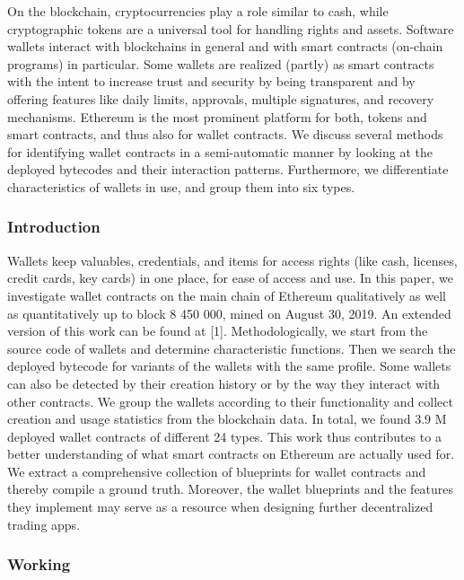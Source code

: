 \documentclass[12pt]{article}
\begin{document}
   On the blockchain, cryptocurrencies play a role
similar to cash, while cryptographic tokens are a universal
tool for handling rights and assets. Software wallets interact
with blockchains in general and with smart contracts (on-chain
programs) in particular. Some wallets are realized (partly) as
smart contracts with the intent to increase trust and security
by being transparent and by offering features like daily limits,
approvals, multiple signatures, and recovery mechanisms.
Ethereum is the most prominent platform for both, tokens
and smart contracts, and thus also for wallet contracts. We
discuss several methods for identifying wallet contracts in a
semi-automatic manner by looking at the deployed bytecodes
and their interaction patterns. Furthermore, we differentiate
characteristics of wallets in use, and group them into six types.

\subsubsection{Introduction}

\par 
Wallets keep valuables, credentials, and items for access
rights (like cash, licenses, credit cards, key cards) in one place,
for ease of access and use. In this paper, we investigate wallet
contracts on the main chain of Ethereum qualitatively as well
as quantitatively up to block 8 450 000, mined on August 30,
2019. An extended version of this work can be found at [1].
Methodologically, we start from the source code of wallets
and determine characteristic functions. Then we search the
deployed bytecode for variants of the wallets with the same
profile. Some wallets can also be detected by their creation
history or by the way they interact with other contracts. We
group the wallets according to their functionality and collect
creation and usage statistics from the blockchain data. In total,
we found 3.9 M deployed wallet contracts of different 24 types.
This work thus contributes to a better understanding of what
smart contracts on Ethereum are actually used for. We extract
a comprehensive collection of blueprints for wallet contracts
and thereby compile a ground truth. Moreover, the wallet
blueprints and the features they implement may serve as a
resource when designing further decentralized trading apps.

\newpage

\subsubsection{Working}
\end{document}
